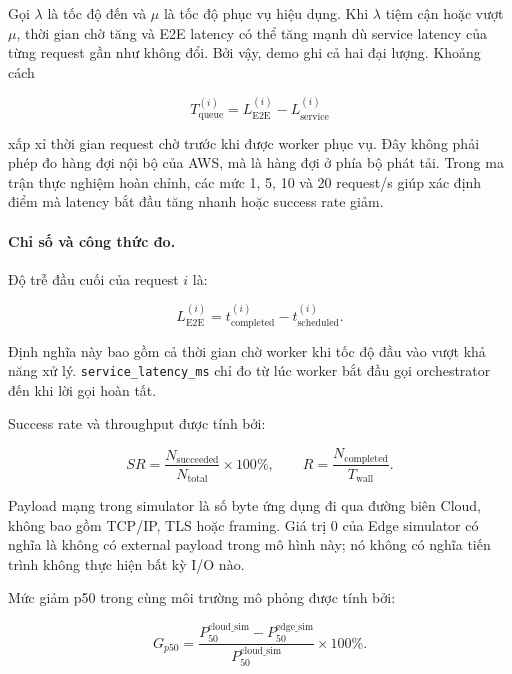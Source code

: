 Gọi $\lambda$ là tốc độ đến và $\mu$ là tốc độ phục vụ hiệu dụng. Khi $\lambda$
tiệm cận hoặc vượt $\mu$, thời gian chờ tăng và E2E latency có thể tăng mạnh dù
service latency của từng request gần như không đổi. Bởi vậy, demo ghi cả hai đại
lượng. Khoảng cách

\begin{equation}
T_{\mathrm{queue}}^{(i)} = L_{\mathrm{E2E}}^{(i)}
- L_{\mathrm{service}}^{(i)}
\label{eq:queue-delay}
\end{equation}

xấp xỉ thời gian request chờ trước khi được worker phục vụ. Đây không phải phép đo
hàng đợi nội bộ của AWS, mà là hàng đợi ở phía bộ phát tải. Trong ma trận thực
nghiệm hoàn chỉnh, các mức 1, 5, 10 và 20 request/s giúp xác định điểm mà latency
bắt đầu tăng nhanh hoặc success rate giảm.

\paragraph{Chỉ số và công thức đo.}

Độ trễ đầu cuối của request $i$ là:

\begin{equation}
L_{\mathrm{E2E}}^{(i)} = t_{\mathrm{completed}}^{(i)}
- t_{\mathrm{scheduled}}^{(i)}.
\label{eq:e2e-latency}
\end{equation}

Định nghĩa này bao gồm cả thời gian chờ worker khi tốc độ đầu vào vượt khả năng xử
lý. \texttt{service\_latency\_ms} chỉ đo từ lúc worker bắt đầu gọi orchestrator đến
khi lời gọi hoàn tất.

Success rate và throughput được tính bởi:

\begin{equation}
SR = \frac{N_{\mathrm{succeeded}}}{N_{\mathrm{total}}}\times 100\%,
\qquad
R = \frac{N_{\mathrm{completed}}}{T_{\mathrm{wall}}}.
\label{eq:success-throughput}
\end{equation}

Payload mạng trong simulator là số byte ứng dụng đi qua đường biên Cloud, không
bao gồm TCP/IP, TLS hoặc framing. Giá trị 0 của Edge simulator có nghĩa là không có
external payload trong mô hình này; nó không có nghĩa tiến trình không thực hiện
bất kỳ I/O nào.

Mức giảm p50 trong cùng môi trường mô phỏng được tính bởi:

\begin{equation}
G_{p50} = \frac{P_{50}^{\mathrm{cloud\_sim}}
- P_{50}^{\mathrm{edge\_sim}}}{P_{50}^{\mathrm{cloud\_sim}}}\times 100\%.
\label{eq:p50-reduction}
\end{equation}

